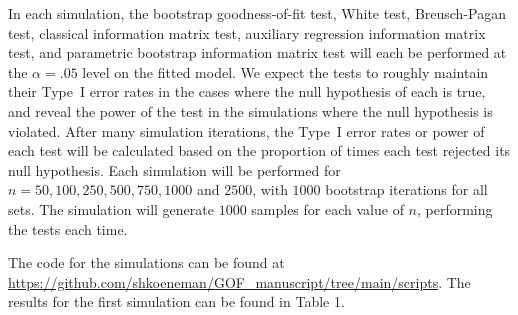 \documentclass[sn-mathphys-ay]{sn-jnl}
\begin{document}
In each simulation, the bootstrap goodness-of-fit test, White test, Breusch-Pagan test, classical information matrix test, auxiliary regression information matrix test, and parametric bootstrap information matrix test will each be performed at the $\alpha = .05$ level on the  fitted model. We expect the tests to roughly maintain their
Type~I error rates in the cases where the null hypothesis of each is true, and reveal the power of the test in the simulations where the null hypothesis is violated. After many simulation iterations, the
Type~I error rates or power of each test will be calculated based on the proportion of times each test rejected its null hypothesis. Each simulation will be performed for $n = 50, 100, 250, 500, 750, 1000$ and $2500$, with $1000$
bootstrap iterations for all sets. The simulation will generate $1000$ samples for each value of $n$, performing the tests each time.

The code for the simulations can be found at \url{https://github.com/shkoeneman/GOF_manuscript/tree/main/scripts}. The results for the first simulation
can be found in Table 1.

%	
\end{document}
